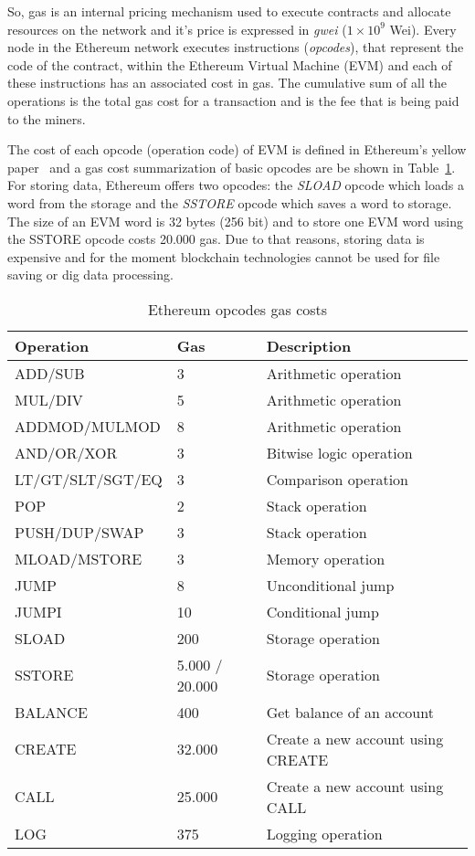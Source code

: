 So, gas is an internal pricing mechanism used to execute contracts and allocate resources on the network and it's price is expressed in \textit{gwei} ($1 \times 10^9$ Wei). Every node in the Ethereum network executes instructions (\textit{opcodes}), that represent the code of the contract, within the Ethereum Virtual Machine (EVM) and each of these instructions has an associated cost in gas. The cumulative sum of all the operations is the total gas cost for a transaction and is the fee that is being paid to the miners.

The cost of each opcode (operation code) of EVM is defined in Ethereum's yellow paper~\cite{ethereum_yellowpaper} and a gas cost summarization of basic opcodes are be shown in Table~\ref{table:opcode_gas_cost}. For storing data, Ethereum offers two opcodes: the \textit{SLOAD} opcode which loads a word from the storage and the \textit{SSTORE} opcode which saves a word to storage. The size of an EVM word is 32 bytes (256 bit) and to store one EVM word using the SSTORE opcode costs 20.000 gas. Due to that reasons, storing data is expensive and for the moment blockchain technologies cannot be used for file saving or dig data processing.

\begin{table}[!ht]
  \centering
  \caption{Ethereum opcodes gas costs}
  \begin{tabular}{|l|l|l|}
  \hline
   Operation & Gas  & Description \\ \hline
   ADD/SUB & 3 & Arithmetic operation \\ \hline
   MUL/DIV & 5 & Arithmetic operation \\ \hline
   ADDMOD/MULMOD & 8 & Arithmetic operation \\ \hline
   AND/OR/XOR & 3 & Bitwise logic operation \\ \hline
   LT/GT/SLT/SGT/EQ & 3 & Comparison operation \\ \hline
   POP & 2 & Stack operation \\ \hline
   PUSH/DUP/SWAP & 3 & Stack operation \\ \hline
   MLOAD/MSTORE & 3 & Memory operation \\ \hline
   JUMP & 8 & Unconditional jump \\ \hline
   JUMPI & 10 & Conditional jump \\ \hline
   SLOAD & 200 & Storage operation \\ \hline
   SSTORE & 5.000 / 20.000 & Storage operation \\ \hline
   BALANCE & 400 & Get balance of an account \\ \hline
   CREATE & 32.000 & Create a new account using CREATE \\ \hline
   CALL & 25.000 & Create a new account using CALL \\ \hline
   LOG & 375 & Logging operation \\ \hline
  \end{tabular}
  \label{table:opcode_gas_cost}
\end{table}


